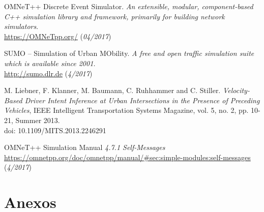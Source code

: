 \documentclass[11pt,letterpaper]{article}
\begin{document}
\begin{thebibliography}{5}
  		 OMNeT++ Discrete Event Simulator.
  		\textit{An extensible, modular, component-based C++ simulation library and framework, primarily for building network simulators}.
  		\\\url{https://OMNeTpp.org/} (\textit{04/2017})

  		 SUMO – Simulation of Urban MObility.
  		\textit{A free and open traffic simulation suite which is available since 2001.}
  		\\\url{http://sumo.dlr.de} (\textit{4/2017})

       M. Liebner, F. Klanner, M. Baumann, C. Ruhhammer and C. Stiller.
      \textit{Velocity-Based Driver Intent Inference at Urban Intersections in the Presence of Preceding Vehicles},
      IEEE Intelligent Transportation Systems Magazine, vol. 5, no. 2, pp. 10-21, Summer 2013.
      \\doi: 10.1109/MITS.2013.2246291

	   OMNeT++ Simulation Manual
	  \textit{4.7.1 Self-Messages}
	  \\\url{https://omnetpp.org/doc/omnetpp/manual/#sec:simple-modules:self-messages} (\textit{4/2017})

\end{thebibliography}
\newpage
\section{Anexos}
\end{document}
